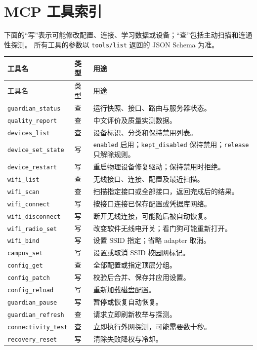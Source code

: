 \documentclass[UTF8,fontset=fandol,11pt,a4paper]{ctexart}
\newcommand{\tool}[1]{\nolinkurl{#1}}
\begin{document}
\section{MCP 工具索引}
下面的“写”表示可能修改配置、连接、学习数据或设备；“查”包括主动扫描和连通性探测。
所有工具的参数以 \tool{tools/list} 返回的 JSON Schema 为准。

\begingroup\footnotesize\setlength{\parskip}{0pt}
\begin{longtable}{@{}p{48mm}p{9mm}p{96mm}@{}}
\toprule 工具名 & 类型 & 用途\\\midrule\endfirsthead
\toprule 工具名 & 类型 & 用途\\\midrule\endhead
\tool{guardian_status} & 查 & 运行快照、接口、路由与服务器状态。\\
\tool{quality_report} & 查 & 中文评价及质量实测数据。\\
\tool{devices_list} & 查 & 设备标识、分类和保持禁用列表。\\
\tool{device_set_state} & 写 & \tool{enabled} 启用；\tool{kept_disabled} 保持禁用；\tool{release} 只解除规则。\\
\tool{device_restart} & 写 & 重启物理设备修复驱动；保持禁用时拒绝。\\
\tool{wifi_list} & 查 & 无线接口、连接、配置及最近扫描。\\
\tool{wifi_scan} & 查 & 扫描指定接口或全部接口，返回完成后的结果。\\
\tool{wifi_connect} & 写 & 按接口连接已保存配置或凭据库网络。\\
\tool{wifi_disconnect} & 写 & 断开无线连接，可能随后被自动恢复。\\
\tool{wifi_radio_set} & 写 & 改变软件无线电开关；看门狗可能重新打开。\\
\tool{wifi_bind} & 写 & 设置 SSID 指定；省略 adapter 取消。\\
\tool{campus_set} & 写 & 设置或取消 SSID 校园网标记。\\
\tool{config_get} & 查 & 全部配置或指定顶层分组。\\
\tool{config_patch} & 写 & 校验后合并、保存并应用设置。\\
\tool{config_reload} & 写 & 重新加载磁盘配置。\\
\tool{guardian_pause} & 写 & 暂停或恢复自动恢复。\\
\tool{guardian_refresh} & 查 & 请求立即刷新枚举与探测。\\
\tool{connectivity_test} & 查 & 立即执行外网探测，可能需要数十秒。\\
\tool{recovery_reset} & 写 & 清除失败降权与冷却。\\

\end{longtable}
\end{document}
